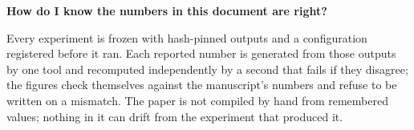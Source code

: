 \documentclass[10pt,a4paper]{article}
\newcommand{\Q}[1]{\par\medskip\noindent\textbf{#1}\par\nopagebreak\vspace{0.15em}\nopagebreak}
\begin{document}
\Q{How do I know the numbers in this document are right?}
Every experiment is frozen with hash-pinned outputs and a configuration registered before it ran.
Each reported number is generated from those outputs by one tool and recomputed independently by a
second that fails if they disagree; the figures check themselves against the manuscript's numbers
and refuse to be written on a mismatch. The paper is not compiled by hand from remembered values;
nothing in it can drift from the experiment that produced it.
\end{document}

